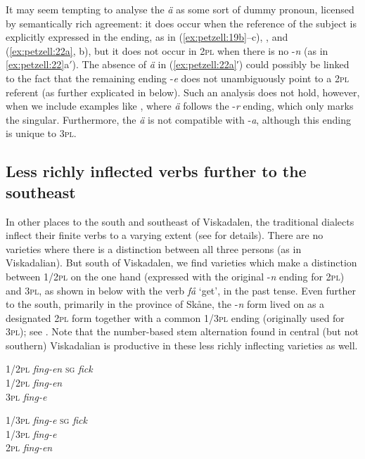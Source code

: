 \documentclass[output=paper,colorlinks,citecolor=brown,draft,draftmode]{langscibook}
\begin{document}
It may seem tempting to analyse the \textit{ä} as some sort of dummy pronoun, licensed by semantically rich agreement: it does occur when the reference of the subject is explicitly expressed in the ending, as in (\ref{ex:petzell:19b}–c), , and (\ref{ex:petzell:22a}, b), but it does not occur in 2\textsc{pl} when there is no -\textit{n} (as in \ref{ex:petzell:22}a$'$). The absence of \textit{ä} in (\ref{ex:petzell:22a}′) could possibly be linked to the fact that the remaining ending -\textit{e} does not unambiguously point to a 2\textsc{pl} referent (as further explicated in  below). Such an analysis does not hold, however, when we include examples like , where \textit{ä} follows the -\textit{r} ending, which only marks the singular. Furthermore, the \textit{ä} is not compatible with -\textit{a}, although this ending is unique to 3\textsc{pl}.


\subsection{Less richly inflected verbs further to the southeast}\label{sec:petzell:3.2}


In other places to the south and southeast of Viskadalen, the traditional dialects inflect their finite verbs to a varying extent (see \citealt{Horn2015,Horn2017} for details). There are no varieties where there is a distinction between all three persons (as in Viskadalian). But south of Viskadalen, we find varieties which make a distinction between 1/2\textsc{pl} on the one hand (expressed with the original -\textit{n} ending for 2\textsc{pl}) and 3\textsc{pl}, as shown in  below with the verb \textit{få} ‘get’, in the past tense. Even further to the south, primarily in the province of Skåne, the -\textit{n} form lived on as a designated 2\textsc{pl} form together with a common 1/3\textsc{pl} ending (originally used for 3\textsc{pl}); see . Note that the number-based stem alternation found in central (but not southern) Viskadalian is productive in these less richly inflecting varieties as well.

\ea\label{ex:petzell:23}
\begin{multicols}{2}
\ea \label{ex:petzell:23a}\begin{tabbing}
    1/2\textsc{pl}  \=   \textit{fing-en}  \kill
    \textsc{sg}     \> \textit{fick}\\                          
    1/2\textsc{pl}  \>  \textit{fing-en}\\
    3\textsc{pl}    \>    \textit{fing-e}
    \end{tabbing}
\ex \label{ex:petzell:23b}\begin{tabbing}
   1/3\textsc{pl} \= \textit{fing-e}\kill
   \textsc{sg}    \> \textit{fick}\\
   1/3\textsc{pl} \> \textit{fing-e}\\
   2\textsc{pl}   \> \textit{fing-en}
   \end{tabbing}
\z
\end{multicols}
\z
\end{document}
